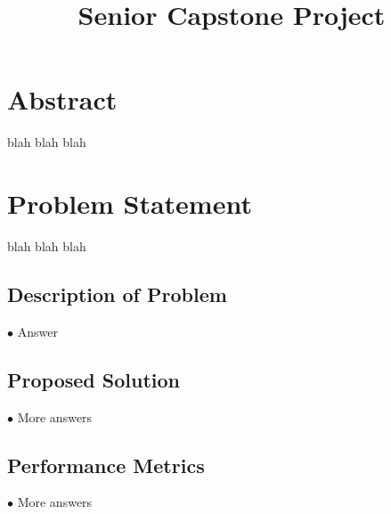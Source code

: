\documentclass[letterpaper,10pt,fleqn,draftclsnofoot,onecolumn]{IEEEtran}
\title{Senior Capstone Project}
\author{\name}
\begin{document}
	\maketitle
	\hrulefill
	\section*{Abstract}
	blah blah blah
	\newpage
	
	\section*{Problem Statement}
	blah blah blah
	
	\subsection{Description of Problem}
	$\bullet$ Answer
	
	\subsection{Proposed Solution}
	$\bullet$ More answers
	
	\subsection{Performance Metrics}
	$\bullet$ More answers
	

	
\end{document}
